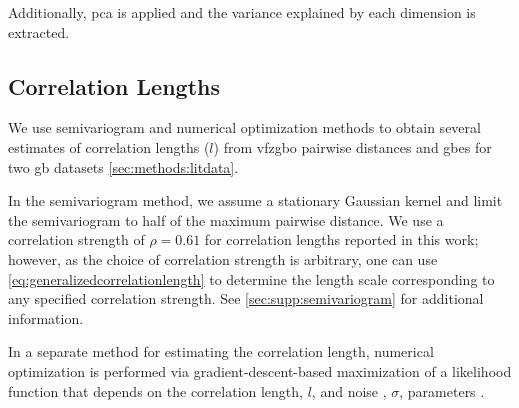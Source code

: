 \documentclass[final,twocolumn,12pt]{elsarticle}
\begin{document}
    Additionally, \gls{pca} is applied and the variance explained by each dimension is extracted.

    \subsection{Correlation Lengths} \label{sec:methods:correlation}
    We use semivariogram and numerical optimization methods to obtain several estimates of correlation lengths ($l$) from \gls{vfzgbo} pairwise distances and \glspl{gbe} for two \gls{gb} datasets \cref{sec:methods:litdata}.
    
    In the semivariogram method, we assume a stationary Gaussian kernel and limit the semivariogram to half of the maximum pairwise distance. We use a correlation strength of $\rho = 0.61$ for correlation lengths reported in this work; however, as the choice of correlation strength is arbitrary, one can use \cref{eq:generalizedcorrelationlength} to determine the length scale corresponding to any specified correlation strength. See \cref{sec:supp:semivariogram} for additional information.
    
    In a separate method for estimating the correlation length, numerical optimization is performed via gradient-descent-based maximization of a likelihood function that depends on the correlation length, $l$, and noise , $\sigma$, parameters \cite{ExactGPRMethod}.
    
    
\end{document}
